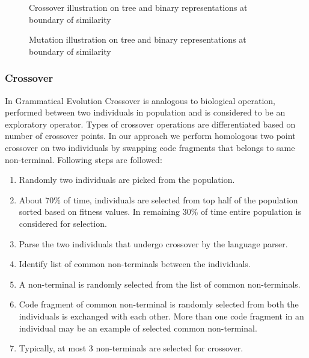 \documentclass{acm_proc_article-sp}
\begin{document}
\begin{figure*}
\centering
{}
\label{fig2}
\caption{Crossover illustration on tree and binary representations at boundary of similarity}
\end{figure*}

\begin{figure*}
\centering
{}
\label{fig3}
\caption{Mutation illustration on tree and binary representations at boundary of similarity}
\end{figure*}

\subsubsection{Crossover}
In Grammatical Evolution Crossover \cite{Ryan03} is analogous to biological operation, performed between two individuals in population and is considered to be an exploratory operator. Types of crossover operations are differentiated based on number of crossover points. In our approach we perform  homologous two point crossover on two individuals by swapping code fragments that belongs to same non-terminal. Following steps are followed:

\begin{enumerate}
\item Randomly two individuals are picked from the population. 
\item About 70\% of time, individuals are selected from top half of the population sorted based on fitness values. In remaining 30\% of time entire population is considered for selection.
\item Parse the two individuals that undergo crossover by the language parser. \item Identify list of common non-terminals between the individuals.
\item A non-terminal is randomly selected from the list of common non-terminals. 
\item Code fragment of common non-terminal is randomly selected from both the individuals is exchanged with each other. More than one code fragment in an individual may be an example of selected common non-terminal.
\item Typically, at most 3 non-terminals are selected for crossover. 
\end{enumerate}
\end{document}
